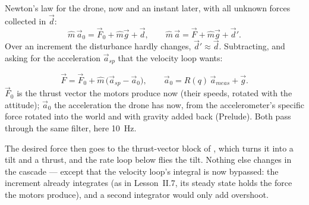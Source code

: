 Newton's law for the drone, now and an instant later, with all unknown forces collected in $\vec d$:
\begin{equation*}
  \hat m\,\vec a_0 = \vec F_0 + \hat m\vec g + \vec d, \qquad \hat m\,\vec a = \vec F + \hat m\vec g + \vec d' .
\end{equation*}
Over an increment the disturbance hardly changes, $\vec d' \approx \vec d$. Subtracting, and asking for the acceleration $\vec a_{sp}$ that the velocity loop wants:

\begin{result}
\begin{equation}\label{eq:indiwind-law}
  \vec F = \vec F_0 + \hat m\,\big(\vec a_{sp} - \vec a_0\big), \qquad \vec a_0 = R(q)\,\vec a_{meas} + \vec g .
\end{equation}
$\vec F_0$ is the thrust vector the motors produce now (their speeds, rotated with the attitude); $\vec a_0$ the acceleration the drone has now, from the accelerometer's specific force rotated into the world and with gravity added back (Prelude). Both pass through the same filter, here \SI{10}{Hz}.
\end{result}

The desired force then goes to the thrust-vector block of , which turns it into a tilt and a thrust, and the rate loop below flies the tilt. Nothing else changes in the cascade — except that the velocity loop's integral is now bypassed: the increment already integrates (as in Lesson~II.7, its steady state holds the force the motors produce), and a second integrator would only add overshoot.

